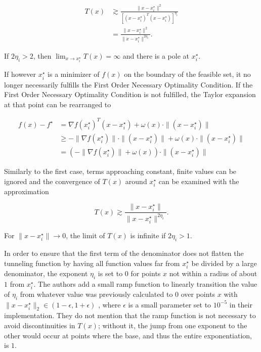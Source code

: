 \documentclass[a4paper,12pt,twoside]{article}
\begin{document}
\begin{align*}
T(x) &\gtrsim \frac{\|x-x_i^\star\|^2}{[(x-x_i^\star)^T(x-x_i^\star)]^{\eta_i}} \\
&= \frac{\|x-x_i^\star\|^2}{\|x-x_i^\star\|^{2\eta_i}}.
\end{align*}

If $2\eta_i > 2$, then $\lim_{x \to x_i^\star} T(x) = \infty $ and there is a pole at $x_i^\star$.

If however $x_i^\star$ is a minimizer of $f(x)$ on the boundary of the feasible set, it no longer necessarily fulfills the First Order Necessary Optimality Condition. If the First Order Necessary Optimality Condition is not fulfilled, the Taylor expansion at that point can be rearranged to

\begin{align*}
f(x) - f^\star &= \nabla f(x_i^\star)^T(x-x_i^\star) + \omega(x) \cdot \|(x-x_i^\star)\| \\
&\geq -\| \nabla f(x_i^\star)\| \cdot \|(x-x_i^\star)\| + \omega(x) \cdot \|(x-x_i^\star)\| \\
&= (-\| \nabla f(x_i^\star)\| + \omega(x)) \cdot \|(x-x_i^\star)\|
\end{align*}


Similarly to the first case, terms approaching constant, finite values can be ignored and the convergence of $T(x)$ around $x_i^\star$ can be examined with the approximation

\[
T(x) \gtrsim \frac{\|x-x_i^\star\|}{\|x-x_i^\star\|^{2\eta_i}}.
\]

For $\|x-x_i^\star\| \to 0$, the limit of $T(x)$ is infinite if $2\eta_i > 1$.

In order to ensure that the first term of the denominator does not flatten the tunneling function by having all function values far from $x_i^\star$ be divided by a large denominator, the exponent $\eta_i$ is set to $0$ for points $x$ not within a radius of about $1$ from $x_i^\star$. The authors add a small ramp function to linearly transition the value of $\eta_i$ from whatever value was previously calculated to $0$ over points $x$ with $\| x-x_i^\star\|_2 \in (1-\epsilon, 1+\epsilon)$ \cite[Eq. A.5]{levy_tunneling_1985}, where $\epsilon$ is a small parameter set to $10^{-5}$ in their implementation. They do not mention that the ramp function is not necessary to avoid discontinuities in $T(x)$; without it, the jump from one exponent to the other would occur at points where the base, and thus the entire exponentiation, is $1$. 
\end{document}
